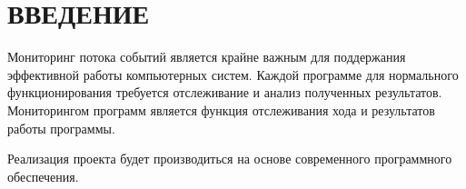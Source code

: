 \section*{ВВЕДЕНИЕ}

Мониторинг потока событий является крайне важным
для поддержания эффективной работы компьютерных систем.
Каждой программе для нормального функционирования требуется отслеживание и
анализ полученных результатов. Мониторингом программ является функция
отслеживания хода и результатов работы программы.

Реализация проекта будет производиться на основе современного программного
обеспечения.

\pagebreak
